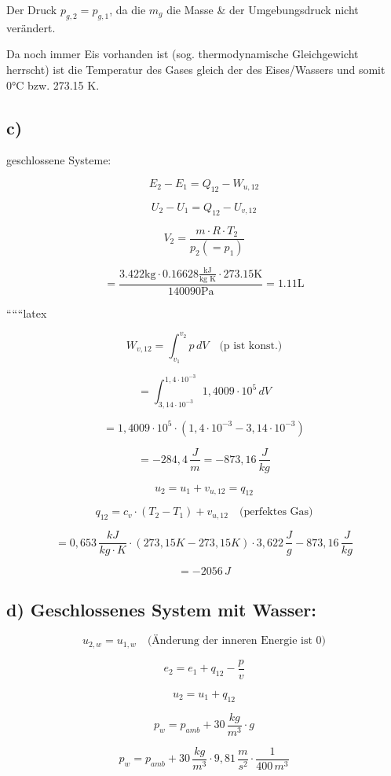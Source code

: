 Der Druck $p_{g,2} = p_{g,1}$, da die $m_g$ die Masse \& der Umgebungsdruck nicht verändert.

Da noch immer Eis vorhanden ist (sog. thermodynamische Gleichgewicht herrscht) ist die Temperatur des Gases gleich der des Eises/Wassers und somit 0°C bzw. 273.15 K.

\subsection*{c)}

\noindent
geschlossene Systeme:

\[
E_2 - E_1 = Q_{12} - W_{u,12}
\]

\[
U_2 - U_1 = Q_{12} - U_{v,12}
\]

\[
V_2 = \frac{m \cdot R \cdot T_2}{p_2 ( = p_1)}
\]

\[
= \frac{3.422 \text{kg} \cdot 0.16628 \frac{\text{kJ}}{\text{kg K}} \cdot 273.15 \text{K}}{140090 \text{Pa}} = 1.11 \text{L}
\]

``````latex


\[
W_{v,12} = \int_{v_1}^{v_2} p \, dV \quad \text{(p ist konst.)}
\]

\[
= \int_{3,14 \cdot 10^{-3}}^{1,4 \cdot 10^{-3}} 1,4009 \cdot 10^5 \, dV
\]

\[
= 1,4009 \cdot 10^5 \cdot \left(1,4 \cdot 10^{-3} - 3,14 \cdot 10^{-3}\right)
\]

\[
= -284,4 \, \frac{J}{m} = -873,16 \, \frac{J}{kg}
\]

\[
u_2 = u_1 + v_{u,12} = q_{12}
\]

\[
q_{12} = c_v \cdot (T_2 - T_1) + v_{u,12} \quad \text{(perfektes Gas)}
\]

\[
= 0,653 \, \frac{kJ}{kg \cdot K} \cdot (273,15K - 273,15K) \cdot 3,622 \, \frac{J}{g} - 873,16 \, \frac{J}{kg}
\]

\[
= -2056 \, J
\]

\subsection*{d) Geschlossenes System mit Wasser:}

\[
u_{2,w} = u_{1,w} \quad \text{(Änderung der inneren Energie ist 0)}
\]

\[
e_2 = e_1 + q_{12} - \frac{p}{v}
\]

\[
u_2 = u_1 + q_{12}
\]

\[
p_w = p_{amb} + 30 \, \frac{kg}{m^3} \cdot g
\]

\[
p_w = p_{amb} + 30 \, \frac{kg}{m^3} \cdot 9,81 \, \frac{m}{s^2} \cdot \frac{1}{400 \, m^3}
\]

